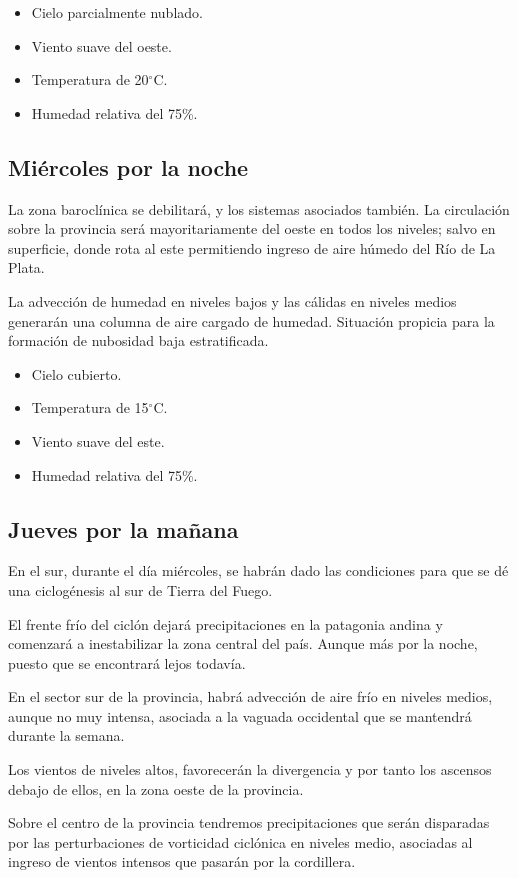 \documentclass{article}
\begin{document}
\begin{itemize}
    \item Cielo parcialmente nublado.
    \item Viento suave del oeste.
    \item Temperatura de 20$^\circ$C.
    \item Humedad relativa del 75\%.
\end{itemize}

\subsection{Miércoles por la noche}
La zona baroclínica se debilitará, y los sistemas asociados también. La circulación sobre la provincia será mayoritariamente del oeste 
en todos los niveles; salvo en superficie, donde rota al este permitiendo ingreso de aire húmedo del Río de La Plata.
\par La advección de humedad en niveles bajos y las cálidas en niveles medios generarán una columna de aire cargado de humedad.
Situación propicia para la formación de nubosidad baja estratificada.

\begin{itemize}
    \item Cielo cubierto.
    \item Temperatura de 15$^\circ$C.
    \item Viento suave del este.
    \item Humedad relativa del 75\%.
\end{itemize}

\subsection{Jueves por la mañana}
En el sur, durante el día miércoles, se habrán dado las condiciones para que se dé una ciclogénesis al sur de Tierra del Fuego.
\par El frente frío del ciclón dejará precipitaciones en la patagonia andina y comenzará a inestabilizar la zona central del país.
Aunque más por la noche, puesto que se encontrará lejos todavía.
\par En el sector sur de la provincia, habrá advección de aire frío en niveles medios, aunque no muy intensa, asociada a la vaguada occidental
que se mantendrá durante la semana.
\par Los vientos de niveles altos, favorecerán la divergencia y por tanto los ascensos debajo de ellos, en la zona oeste de la provincia.
\par Sobre el centro de la provincia tendremos precipitaciones que serán disparadas por las perturbaciones de vorticidad ciclónica en niveles medio,
asociadas al ingreso de vientos intensos que pasarán por la cordillera.
\end{document}
